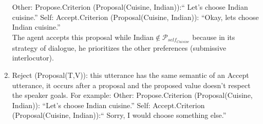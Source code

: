 \documentclass{llncs}
\begin{document}
\begin{enumerate}
		\subitem Other: Propose.Criterion (Proposal(Cuisine, Indian)):`` Let's choose Indian cuisine.''
		\subitem Self: Accept.Criterion (Proposal(Cuisine, Indian)): ``Okay, lets choose Indian cuisine.''
		\\The agent accepts this proposal while Indian$\notin \mathcal{P}_{self_{Cuisine}}$ because in its strategy of dialogue, he prioritizes the other preferences (submissive interlocutor).
	\\	
	\item Reject (Proposal(T,V)): this utterance has the same semantic of an Accept utterance, it occurs after a proposal and the proposed value doesn't respect the speaker goals. For example: 
		\subitem Other: Propose.Criterion (Proposal(Cuisine, Indian)): ``Let's choose Indian cuisine.'' 
		\subitem Self: Accept.Criterion (Proposal(Cuisine, Indian)):`` Sorry, I would choose something else.'' 
	\\
	
\end{enumerate}
 
\noindent 
\vskip 4pt


\end{document}
